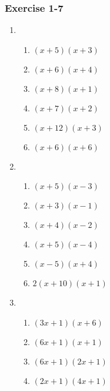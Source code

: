 {\begin{multicols}{3}

\subsubsection*{Exercise 1-7} %
\begin{enumerate}[noitemsep, label=\textbf{\arabic*}. ] 
\item %

\begin{enumerate}[noitemsep, label=\textbf{(\alph*)} ] 
\item $(x + 5)(x + 3)$%
\item $(x + 6)(x + 4)$%
\item $(x + 8)(x + 1)$%
\item $(x + 7)(x + 2)$%
\item $(x + 12)(x + 3)$%
\item $(x + 6)(x + 6)$%
\end{enumerate}



\item %

\begin{enumerate}[noitemsep, label=\textbf{(\alph*)} ]  
\item $(x + 5)(x - 3)$%
\item $(x + 3)(x - 1)$%
\item $(x + 4)(x - 2)$%
\item $(x + 5)(x - 4)$%
\item $(x - 5)(x + 4)$%
\item $2(x + 10)(x + 1)$%
\end{enumerate}



\item %

\begin{enumerate}[noitemsep, label=\textbf{(\alph*)} ] 

\item $(3x + 1)(x + 6)$%
\item $(6x + 1)(x + 1)$%
\item $(6x + 1)(2x + 1)$%
\item $(2x + 1)(4x + 1)$%
\end{enumerate}



\end{enumerate}
\end{multicols}}
